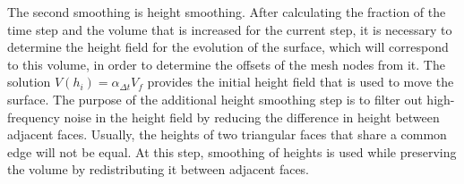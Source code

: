 \documentclass[
11pt,%
tightenlines,%
twoside,%
onecolumn,%
nofloats,%
nobibnotes,%
nofootinbib,%
superscriptaddress,%
noshowpacs,%
centertags]%
{revtex4-2}
\begin{document}
The second smoothing is height smoothing.
After calculating the fraction of the time step and the volume that is increased for the current step, it is necessary to determine the height field for the evolution of the surface, which will correspond to this volume, in order to determine the offsets of the mesh nodes from it.
The solution $V(h_i) = \alpha_{\Delta t} V_f$ provides the initial height field that is used to move the surface.
The purpose of the additional height smoothing step is to filter out high-frequency noise in the height field by reducing the difference in height between adjacent faces.
Usually, the heights of two triangular faces that share a common edge will not be equal.
At this step, smoothing of heights is used while preserving the volume by redistributing it between adjacent faces.
\end{document}
